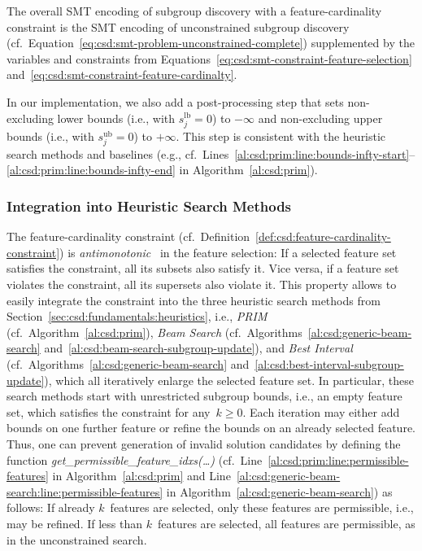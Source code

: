 \documentclass{article}
\theoremstyle{definition}
\begin{document}
The overall SMT encoding of subgroup discovery with a feature-cardinality constraint is the SMT encoding of unconstrained subgroup discovery (cf.~Equation~\ref{eq:csd:smt-problem-unconstrained-complete}) supplemented by the variables and constraints from Equations~\ref{eq:csd:smt-constraint-feature-selection} and~\ref{eq:csd:smt-constraint-feature-cardinalty}.

In our implementation, we also add a post-processing step that sets non-excluding lower bounds (i.e., with $s^{\text{lb}}_j = 0$) to $-\infty$ and non-excluding upper bounds (i.e., with $s^{\text{ub}}_j = 0$) to $+\infty$.
This step is consistent with the heuristic search methods and baselines (e.g., cf.~Lines~\ref{al:csd:prim:line:bounds-infty-start}--\ref{al:csd:prim:line:bounds-infty-end} in Algorithm~\ref{al:csd:prim}).

\subsubsection{Integration into Heuristic Search Methods}
\label{sec:csd:approach:cardinality:heuristics}

The feature-cardinality constraint (cf.~Definition~\ref{def:csd:feature-cardinality-constraint}) is \emph{antimonotonic}~\cite{ng1998exploratory} in the feature selection:
If a selected feature set satisfies the constraint, all its subsets also satisfy it.
Vice versa, if a feature set violates the constraint, all its supersets also violate it.
This property allows to easily integrate the constraint into the three heuristic search methods from Section~\ref{sec:csd:fundamentals:heuristics}, i.e., \emph{PRIM} (cf.~Algorithm~\ref{al:csd:prim}), \emph{Beam Search} (cf.~Algorithms~\ref{al:csd:generic-beam-search} and~\ref{al:csd:beam-search-subgroup-update}), and \emph{Best Interval} (cf.~Algorithms~\ref{al:csd:generic-beam-search} and~\ref{al:csd:best-interval-subgroup-update}), which all iteratively enlarge the selected feature set.
In particular, these search methods start with unrestricted subgroup bounds, i.e., an empty feature set, which satisfies the constraint for any~$k \geq 0$.
Each iteration may either add bounds on one further feature or refine the bounds on an already selected feature.
Thus, one can prevent generation of invalid solution candidates by defining the function \emph{get\_permissible\_feature\_idxs(\dots)} (cf.~Line~\ref{al:csd:prim:line:permissible-features} in Algorithm~\ref{al:csd:prim} and Line~\ref{al:csd:generic-beam-search:line:permissible-features} in Algorithm~\ref{al:csd:generic-beam-search}) as follows:
If already $k$~features are selected, only these features are permissible, i.e., may be refined.
If less than $k$~features are selected, all features are permissible, as in the unconstrained search.
\end{document}
